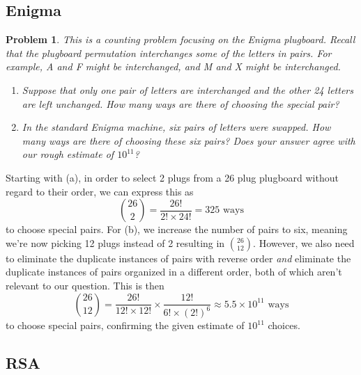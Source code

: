 \documentclass[12pt]{article}
\newtheorem{problem}{Problem}
\theoremstyle{remark}  %
\begin{document}
\subsection{Enigma}

    \setcounter{problem}{0}
    \begin{problem}
            This is a counting problem focusing on the Enigma plugboard. Recall that the plugboard permutation interchanges some of the letters in pairs. For example, A and F might be interchanged, and M and X might be interchanged.
            \begin{enumerate}[label=(\alph*)]
                \item Suppose that only one pair of letters are interchanged and the other 24 letters are left unchanged. How many ways are there of choosing the special pair?
                \item In the standard Enigma machine, six pairs of letters were swapped. How many ways are there of choosing these six pairs? Does your answer agree with our rough estimate of $10^{11}$?
            \end{enumerate}
    \end{problem}
    Starting with (a), in order to select 2 plugs from a 26 plug plugboard without regard to their order, we can express this as $${26\choose2} =\frac{26!}{2!\times24!}=325\text{ ways}$$ to choose special pairs. For (b), we increase the number of pairs to six, meaning we're now picking 12 plugs instead of 2 resulting in ${26\choose12}$. However, we also need to eliminate the duplicate instances of pairs with reverse order \emph{and} eliminate the duplicate instances of pairs organized in a different order, both of which aren't relevant to our question. This is then $${26\choose12} = \frac{26!}{12!\times 12!} \times \frac{12!}{6!\times(2!)^6}\approx5.5\times10^{11}\text{ ways}$$ to choose special pairs, confirming the given estimate of $10^{11}$ choices.

\setcounter{subsection}{8}
\subsection{RSA}
\end{document}
